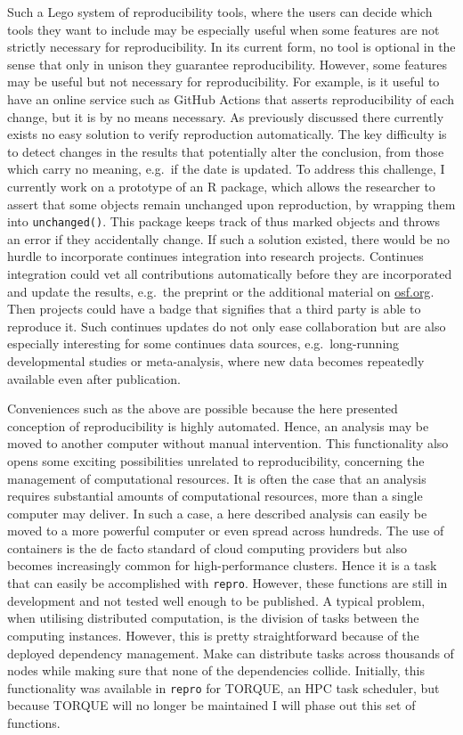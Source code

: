 \documentclass[12pt,a4paper,twoside]{article}
\begin{document}
Such a Lego system of reproducibility tools, where the users can decide which tools they want to include may be especially useful when some features are not strictly necessary for reproducibility.
In its current form, no tool is optional in the sense that only in unison they guarantee reproducibility.
However, some features may be useful but not necessary for reproducibility.
For example, is it useful to have an online service such as GitHub Actions that asserts reproducibility of each change, but it is by no means necessary.
As previously discussed there currently exists no easy solution to verify reproduction automatically.
The key difficulty is to detect changes in the results that potentially alter the conclusion, from those which carry no meaning, e.g.~if the date is updated.
To address this challenge, I currently work on a prototype of an R package, which allows the researcher to assert that some objects remain unchanged upon reproduction, by wrapping them into \texttt{unchanged()}.
This package keeps track of thus marked objects and throws an error if they accidentally change.
If such a solution existed, there would be no hurdle to incorporate continues integration into research projects.
Continues integration could vet all contributions automatically before they are incorporated and update the results, e.g.~the preprint or the additional material on \url{osf.org}.
Then projects could have a badge that signifies that a third party is able to reproduce it.
Such continues updates do not only ease collaboration but are also especially interesting for some continues data sources, e.g.~long-running developmental studies or meta-analysis, where new data becomes repeatedly available even after publication.

Conveniences such as the above are possible because the here presented conception of reproducibility is highly automated.
Hence, an analysis may be moved to another computer without manual intervention.
This functionality also opens some exciting possibilities unrelated to reproducibility, concerning the management of computational resources.
It is often the case that an analysis requires substantial amounts of computational resources, more than a single computer may deliver.
In such a case, a here described analysis can easily be moved to a more powerful computer or even spread across hundreds.
The use of containers is the de facto standard of cloud computing providers but also becomes increasingly common for high-performance clusters.
Hence it is a task that can easily be accomplished with \texttt{repro}.
However, these functions are still in development and not tested well enough to be published.
A typical problem, when utilising distributed computation, is the division of tasks between the computing instances.
However, this is pretty straightforward because of the deployed dependency management.
Make can distribute tasks across thousands of nodes while making sure that none of the dependencies collide.
Initially, this functionality was available in \texttt{repro} for TORQUE, an HPC task scheduler, but because TORQUE will no longer be maintained I will phase out this set of functions.
\end{document}

